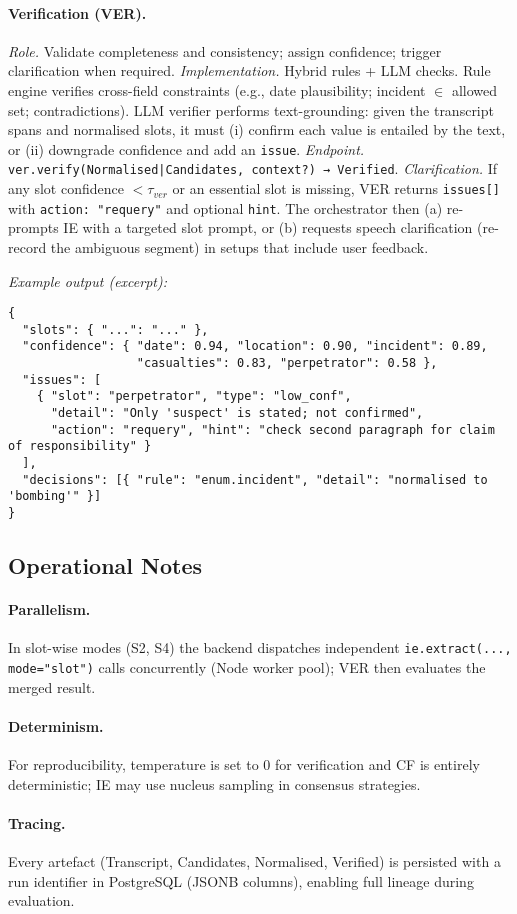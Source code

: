 \paragraph{Verification (VER).}
\emph{Role.} Validate completeness and consistency; assign confidence; trigger clarification when required.  
\emph{Implementation.} Hybrid rules + LLM checks. Rule engine verifies cross-field constraints (e.g., date plausibility; incident $\in$ allowed set; contradictions). LLM verifier performs text-grounding: given the transcript spans and normalised slots, it must (i) confirm each value is entailed by the text, or (ii) downgrade confidence and add an \texttt{issue}.  
\emph{Endpoint.} \texttt{ver.verify(Normalised|Candidates, context?) → Verified}.  
\emph{Clarification.} If any slot confidence $<\tau_{ver}$ or an essential slot is missing, VER returns \texttt{issues[]} with \texttt{action: "requery"} and optional \texttt{hint}. The orchestrator then (a) re-prompts IE with a targeted slot prompt, or (b) requests speech clarification (re-record the ambiguous segment) in setups that include user feedback.

\medskip
\noindent\emph{Example output (excerpt):}
\begin{verbatim}
{
  "slots": { "...": "..." },
  "confidence": { "date": 0.94, "location": 0.90, "incident": 0.89,
                  "casualties": 0.83, "perpetrator": 0.58 },
  "issues": [
    { "slot": "perpetrator", "type": "low_conf",
      "detail": "Only 'suspect' is stated; not confirmed",
      "action": "requery", "hint": "check second paragraph for claim of responsibility" }
  ],
  "decisions": [{ "rule": "enum.incident", "detail": "normalised to 'bombing'" }]
}
\end{verbatim}

\subsection*{Operational Notes}

\paragraph{Parallelism.} In slot-wise modes (S2, S4) the backend dispatches independent \texttt{ie.extract(..., mode="slot")} calls concurrently (Node worker pool); VER then evaluates the merged result.  
\paragraph{Determinism.} For reproducibility, temperature is set to $0$ for verification and CF is entirely deterministic; IE may use nucleus sampling in consensus strategies.  
\paragraph{Tracing.} Every artefact (Transcript, Candidates, Normalised, Verified) is persisted with a run identifier in PostgreSQL (JSONB columns), enabling full lineage during evaluation.

